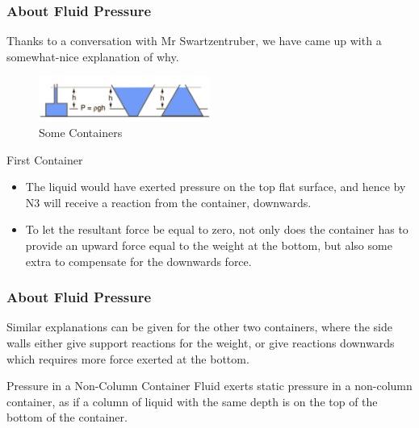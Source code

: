 \documentclass{beamer}
\begin{document}
        \begin{frame}
            \frametitle{About Fluid Pressure}
            Thanks to a conversation with Mr Swartzentruber, we have came up with a somewhat-nice explanation of why.\pause
        
            \begin{figure}
                \centering
                \includegraphics[width=0.5\textwidth]{FluidPressure.png}
                \caption{Some Containers}
                \label{fig:FluidContainer}
            \end{figure}\pause
                
            \begin{exampleblock}{First Container}\pause
                \begin{itemize}
                    \item The liquid would have exerted pressure on the top flat surface, and hence by N3 will receive a reaction from the container, downwards.\pause
                    \item To let the resultant force be equal to zero, not only does the container has to provide an upward force equal to the weight at the bottom, but also some extra to compensate for the downwards force.
                \end{itemize}
            \end{exampleblock}
        \end{frame}

        \begin{frame}
            \frametitle{About Fluid Pressure}
            Similar explanations can be given for the other two containers, where the side walls either give support reactions for the weight, or give reactions downwards which requires more force exerted at the bottom.\pause
            
            \begin{alertblock}{Pressure in a Non-Column Container}
                Fluid exerts static pressure in a non-column container, as if a column of liquid with the same depth is on the top of the bottom of the container.
            \end{alertblock}
        \end{frame}
    
\end{document}
